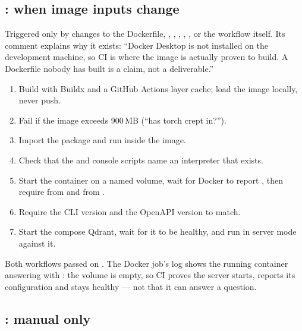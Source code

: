 \subsection{: when image inputs change}

Triggered only by changes to the Dockerfile, , , , , ,  or the workflow itself. Its comment explains why it exists: \enquote{Docker Desktop is not installed on the development machine, so CI is where the image is actually proven to build. A Dockerfile nobody has built is a claim, not a deliverable.}

\begin{enumerate}
  \item Build with Buildx and a GitHub Actions layer cache; load the image locally, never push.
  \item Fail if the image exceeds 900\,MB (\enquote{has torch crept in?}).
  \item Import the package and run  inside the image.
  \item Check that the  and  console scripts name an interpreter that exists.
  \item Start the container on a named volume, wait for Docker to report , then require  from  and  from .
  \item Require the CLI version and the OpenAPI version to match.
  \item Start the compose Qdrant, wait for it to be healthy, and run  in server mode against it.
\end{enumerate}

\begin{verified}
Both workflows passed on . The Docker job's log shows the running container answering  with : the volume is empty, so CI proves the server starts, reports its configuration and stays healthy --- not that it can answer a question.
\end{verified}

\subsection{: manual only}

